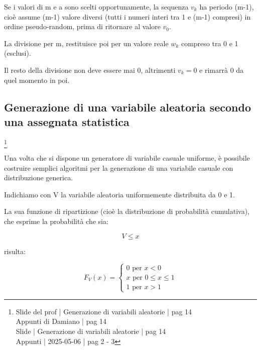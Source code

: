Se i valori di m e a sono scelti opportunamente, 
la sequenza $v_k$ ha periodo (m-1), 
cioè assume (m-1) valore diversi (tutti i numeri interi tra 1 e (m-1) compresi) 
in ordine pseudo-random, 
prima di ritornare al valore $v_0$. \newline 

La divisione per m, 
restituisce poi per un valore reale $w_k$ compreso tra 0 e 1 (esclusi). \newline 

Il resto della divisione non deve essere mai 0, altrimenti $v_k = 0$ e rimarrà 0 da quel momento in poi. \newline 

\newpage 

\subsection{Generazione di una variabile aleatoria secondo una assegnata statistica}
\footnote{Slide del prof | Generazione di variabili aleatorie | pag 14 \\
Appunti di Damiano | pag 14 \\ 
Slide | Generazione di variabili aleatorie | pag  14\\ 
Appunti | 2025-05-06 | pag 2 - 3
} 

Una volta che si dispone un generatore di variabile casuale uniforme, 
è possibile costruire semplici algoritmi per la generazione di una variabile casuale con distribuzione generica. \newline 

Indichiamo con V la variabile aleatoria uniformemente distribuita da 0 e 1. \newline 

La sua funzione di ripartizione (cioè la distribuzione di probabilità cumulativa), 
che esprime la probabilità che sia: 

{
    \Large 
    \begin{equation}
        V \le x
    \end{equation}
}

risulta: 

{
    \Large 
    \begin{equation}
        F_V (x)
        = 
        \begin{cases}
            0 \text{ per }  x < 0 
            \\
            x \text{ per } 0 \le x \le 1 
            \\
            1 \text{ per }  x > 1 
        \end{cases}
    \end{equation}
}

